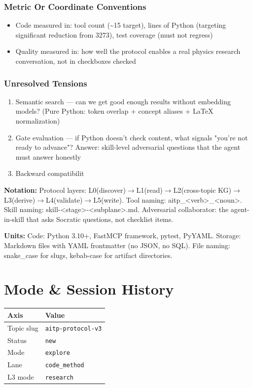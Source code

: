 \documentclass[11pt,a4paper]{article}
\begin{document}
\subsubsection*{Metric Or Coordinate Conventions}

\begin{itemize}
\item Code measured in: tool count (\textasciitilde 15 target), lines of Python (targeting significant reduction from 3273), test coverage (must not regress)
\item Quality measured in: how well the protocol enables a real physics research conversation, not in checkboxes checked
\end{itemize}

\subsubsection*{Unresolved Tensions}

\begin{enumerate}
\item Semantic search — can we get good enough results without embedding models? (Pure Python: token overlap + concept aliases + LaTeX normalization)
\item Gate evaluation — if Python doesn't check content, what signals "you're not ready to advance"? Answer: skill-level adversarial questions that the agent must answer honestly
\item Backward compatibilit
\end{enumerate}

\noindent\textbf{Notation:} Protocol layers: L0(discover)$\rightarrow$L1(read)$\rightarrow$L2(cross-topic KG)$\rightarrow$L3(derive)$\rightarrow$L4(validate)$\rightarrow$L5(write). Tool naming: aitp\_<verb>\_<noun>. Skill naming: skill-<stage>-<subplane>.md. Adversarial collaborator: the agent-in-skill that asks Socratic questions, not checklist items.

\noindent\textbf{Units:} Code: Python 3.10+, FastMCP framework, pytest, PyYAML. Storage: Markdown files with YAML frontmatter (no JSON, no SQL). File naming: snake\_case for slugs, kebab-case for artifact directories.

\section{Mode \& Session History}

\noindent
\begin{tabular}{ll}
\toprule
\textbf{Axis} & \textbf{Value} \\
\midrule
Topic slug & \texttt{aitp-protocol-v3} \\
Status & \texttt{new} \\
Mode & \texttt{explore} \\
Lane & \texttt{code\_method} \\
L3 mode & \texttt{research} \\
\bottomrule
\end{tabular}
\end{document}
